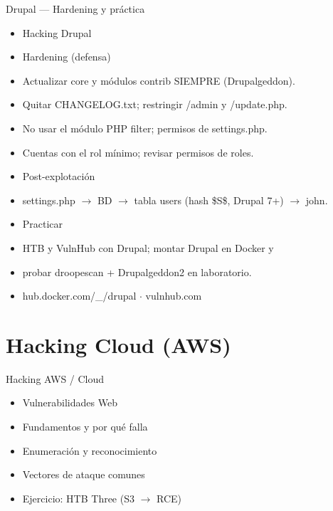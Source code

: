 \documentclass[aspectratio=169,10pt]{beamer}
\begin{document}
\begin{frame}[allowframebreaks]{Drupal --- Hardening y práctica}
\small
  \begin{itemize}
  \item Hacking Drupal
  \item Hardening (defensa)
  \item Actualizar core y módulos contrib SIEMPRE (Drupalgeddon).
  \item Quitar CHANGELOG.txt; restringir /admin y /update.php.
  \item No usar el módulo PHP filter; permisos de settings.php.
  \item Cuentas con el rol mínimo; revisar permisos de roles.
  \item Post-explotación
  \item settings.php $\rightarrow$ BD $\rightarrow$ tabla users (hash \$S\$, Drupal 7+) $\rightarrow$ john.
  \item Practicar
  \item HTB y VulnHub con Drupal; montar Drupal en Docker y
  \item probar droopescan + Drupalgeddon2 en laboratorio.
  \item hub.docker.com/\_/drupal $\cdot$ vulnhub.com
  \end{itemize}
\end{frame}

\section{Hacking Cloud (AWS)}

\begin{frame}[allowframebreaks]{Hacking AWS / Cloud}
\small
  \begin{itemize}
  \item Vulnerabilidades Web
  \item Fundamentos y por qué falla
  \item Enumeración y reconocimiento
  \item Vectores de ataque comunes
  \item Ejercicio: HTB Three (S3 $\rightarrow$ RCE)
  \end{itemize}
\end{frame}
\end{document}
